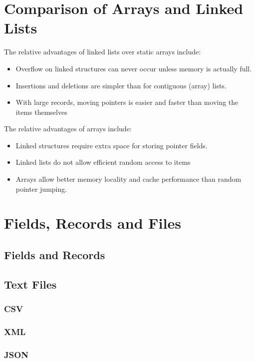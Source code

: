\section{Comparison of Arrays and Linked Lists}
	The relative advantages of linked lists over static arrays include:
		\begin{itemize}
			\item Overflow on linked structures can never occur unless memory is actually full.
			\item Insertions and deletions are simpler than for contiguous (array) lists.
			\item With large records, moving pointers is easier and faster than moving the items themselves
		\end{itemize}
	The relative advantages of arrays include:
	\begin{itemize}
		\item Linked structures require extra space for storing pointer fields.
		\item Linked lists do not allow efficient random access to items
		\item Arrays allow better memory locality and cache performance than random pointer jumping.
	\end{itemize}

\section{Fields, Records and Files}
	
	\subsection{Fields and Records}
	
	\subsection{Text Files}
		\subsubsection{CSV}
		
		\subsubsection{XML}
		
		\subsubsection{JSON}
		

